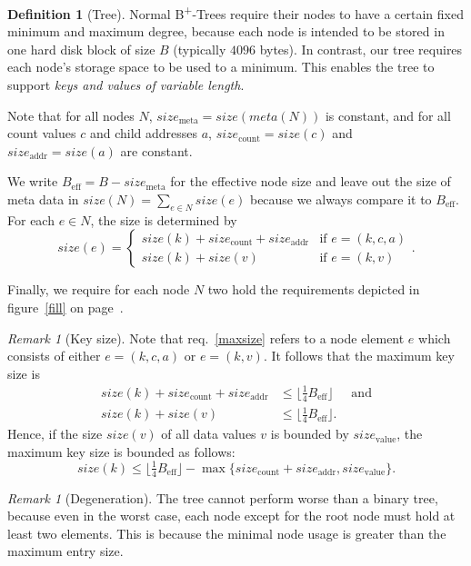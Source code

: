 \documentclass[a4paper, 8pt]{scrartcl}
\theoremstyle{plain}
\theoremstyle{definition}
\newtheorem{defi}[thm]{Definition}
\theoremstyle{remark}
\newtheorem{rem}[thm]{Remark}
\newcommand \BTrees { B\textsuperscript{+}-Trees }
\newcommand \Beff { B_{\text{eff}} }
\begin{document}
\begin{multicols}{2}
\begin{defi}[Tree]
Normal \BTrees require their nodes to have a certain fixed minimum and maximum
degree, because each node is intended to be stored in one hard disk block of
size $B$ (typically $4096$ bytes).
In contrast, our tree requires each node's storage space to be used to a
minimum.
This enables the tree to support {\em keys and values of variable length}.

Note that for all nodes $N$, $size_\text{meta} = size(meta(N))$ is constant,
and for all count values $c$ and child addresses $a$, $size_\text{count} =
size(c)$ and $size_\text{addr} = size(a)$ are constant.

We write $\Beff = B - size_\text{meta}$ for the effective node size and leave
out the size of meta data in $size(N) = \sum_{e \in N} size(e)$ because we
always compare it to $\Beff$.
For each $e \in N$, the size is determined by
\[ size(e) = \begin{cases}
size(k) + size_\text{count} + size_\text{addr} & \text{if } e = (k,c,a)\\
size(k) + size(v)                              & \text{if } e = (k,v)
\end{cases}. \]

Finally, we require for each node $N$ two hold the requirements depicted in
figure~\ref{fill} on page~\pageref{fill}.
\end{defi}


\begin{rem}[Key size]
Note that req.~\ref{maxsize} refers to a node element $e$ which consists
of either \mbox{$e = (k, c, a)$} or \mbox{$e = (k, v)$}.
It follows that the maximum key size is
\begin{align*}
size(k) + size_\text{count} + size_\text{addr}
    &\leq \lfloor \tfrac{1}{4} \Beff \rfloor & \text{ and}\\
size(k) + size(v)
    &\leq \lfloor \tfrac{1}{4} \Beff \rfloor.
\end{align*}
Hence, if the size $size(v)$ of all data values $v$ is bounded by
$size_\text{value}$, the maximum key size is bounded as follows:
\[ size(k) \leq \lfloor \tfrac{1}{4} \Beff \rfloor 
    - \max \{ size_\text{count} + size_\text{addr}, size_\text{value} \}. \]
\end{rem}


\begin{rem}[Degeneration]
The tree cannot perform worse than a binary tree, because even in the worst
case, each node except for the root node must hold at least two elements.
This is because the minimal node usage is greater than the maximum entry size.
\end{rem}




\end{multicols}
\end{document}
